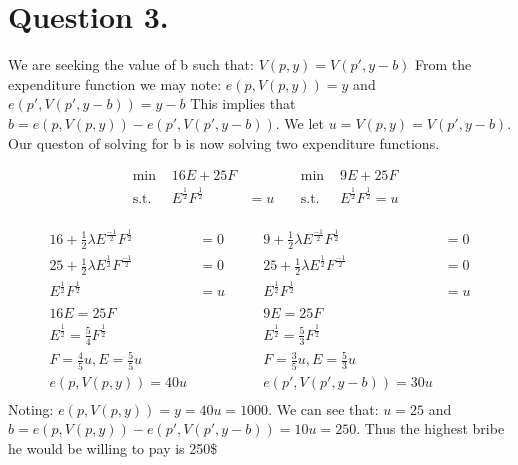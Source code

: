 \documentclass[10pt, letterpaper]{paper}
\begin{document}
\section*{Question 3.}
We are seeking the value of b such that: $V(p,y) = V(p',y-b)$
\newline
From the expenditure function we may note: $e( p, V( p,y)) = y$ and $e( p', V(p',y-b))= y-b$
\newline
This implies that $b = e( p, V(p,y)) - e( p', V(p', y-b ) )$.
\newline
We let $u = V(p,y) = V(p', y-b).$ Our queston of solving for b is now solving two expenditure functions.

\begin{equation*}
\begin{alignedat}{3}
&\text{min }&16E + 25F& \quad \quad \quad & \text{min  }& 9E + 25F\\
&\text{s.t. } &E^{\frac{1}{2}}F^{\frac{1}{2}} &= u & \text{s.t. }& E^{\frac{1}{2}}F^{\frac{1}{2}} = u\\
\end{alignedat}
\end{equation*}

\begin{equation*}
\begin{alignedat}{3}
16 + \frac{1}{2} \lambda E^{\frac{-1}{2}}F^{\frac{1}{2}} &= 0 \quad & 9 + \frac{1}{2} \lambda E^{\frac{-1}{2}}F^{\frac{1}{2}} &= 0\\
25 + \frac{1}{2} \lambda E^{\frac{1}{2}}F^{\frac{-1}{2}} &= 0 \quad\quad & 25 + \frac{1}{2} \lambda E^{\frac{1}{2}}F^{\frac{-1}{2}} &= 0 \\
E^{\frac{1}{2}}F^{\frac{1}{2}} &=u & E^{\frac{1}{2}}F^{\frac{1}{2}} &=u\\
\\
16E = 25F& & 9E = 25F &\\
E^{\frac{1}{2}} = \frac{5}{4} F^{\frac{1}{2}} & & E^{\frac{1}{2}} = \frac{5}{3} F^{\frac{1}{2}} &\\
F = \frac{4}{5} u, E = \frac{5}{5} u & & F = \frac{3}{5} u, E = \frac{5}{3} u &\\
e(p, V(p,y)) = 40u & & e( p', V( p', y-b )) = 30u &\\
\end{alignedat}
\end{equation*}
Noting: $e(p, V(p,y)) = y = 40u = 1000$. We can see that: $u = 25$ and $b =e(p, V(p,y)) - e( p', V( p', y-b )) = 10u = 250$.
Thus the highest bribe he would be willing to pay is 250\$
\end{document}
